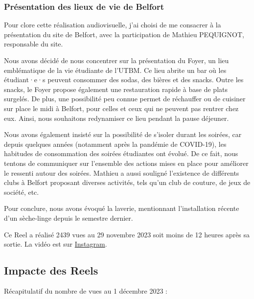 \subsubsection{Présentation des lieux de vie de Belfort}

Pour clore cette réalisation audiovisuelle, j'ai choisi de me consacrer à la présentation du site de Belfort, avec la participation de Mathieu PEQUIGNOT, responsable du site.

Nous avons décidé de nous concentrer sur la présentation du Foyer, un lieu emblématique de la vie étudiante de l'\gls{UTBM}.
Ce lieu abrite un bar où les étudiant·e·s peuvent consommer des sodas, des bières et des snacks.
Outre les snacks, le Foyer propose également une restauration rapide à base de plats surgelés.
De plus, une possibilité peu connue permet de réchauffer ou de cuisiner sur place le midi à Belfort, pour celles et ceux qui ne peuvent pas rentrer chez eux.
Ainsi, nous souhaitons redynamiser ce lieu pendant la pause déjeuner.

Nous avons également insisté sur la possibilité de s'isoler durant les soirées, car depuis quelques années (notamment après la pandémie de COVID-19), les habitudes de consommation des soirées étudiantes ont évolué.
De ce fait, nous tentons de communiquer sur l'ensemble des actions mises en place pour améliorer le ressenti autour des soirées.
Mathieu a aussi souligné l'existence de différents clubs à Belfort proposant diverses activités, tels qu'un club de couture, de jeux de société, etc.

Pour conclure, nous avons évoqué la laverie, mentionnant l'installation récente d'un sèche-linge depuis le semestre dernier.

Ce Reel a réalisé 2439 vues au 29 novembre 2023 soit moins de 12 heures après sa sortie.
La vidéo est sur \href{https://www.instagram.com/reel/C0OWkRusrx2/?utm_source=ig_web_copy_link&igshid=MzRlODBiNWFlZA==}{Instagram}.


\subsection{Impacte des Reels}\label{subsec:impacte-des-reels}


Récapitulatif du nombre de vues au 1 décembre 2023 :

